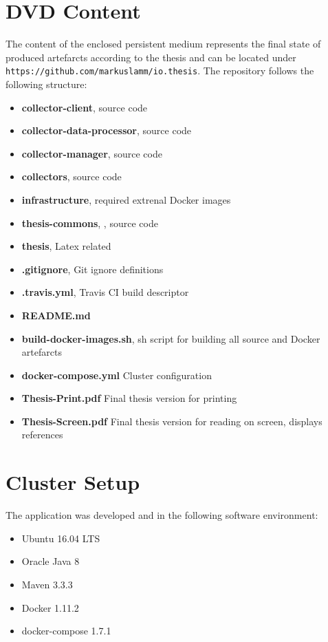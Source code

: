 \section{DVD Content}

The content of the enclosed persistent medium represents the final state of produced artefarcts according to the thesis and
can be located under \newline \verb|https://github.com/markuslamm/io.thesis|. The repository follows the following structure:

\begin{itemize}
	\item \textbf{collector-client}, source code
	\item \textbf{collector-data-processor}, source code
	\item \textbf{collector-manager}, source code
	\item \textbf{collectors}, source code
	\item \textbf{infrastructure}, required extrenal Docker images
	\item \textbf{thesis-commons}, , source code
	\item \textbf{thesis}, Latex related
	\item \textbf{.gitignore}, Git ignore definitions
	\item \textbf{.travis.yml}, Travis CI build descriptor
	\item \textbf{README.md}
	\item \textbf{build-docker-images.sh}, sh script for building all source and Docker artefarcts
	\item \textbf{docker-compose.yml} Cluster configuration
	\item \textbf{Thesis-Print.pdf} Final thesis version for printing
	\item \textbf{Thesis-Screen.pdf} Final thesis version for reading on screen, displays references
\end{itemize}

\section{Cluster Setup}
The application was developed and in the following software environment:

\begin{itemize}
	\item Ubuntu 16.04 LTS
	\item Oracle Java 8
	\item Maven 3.3.3
	\item Docker 1.11.2
	\item docker-compose 1.7.1
\end{itemize}

